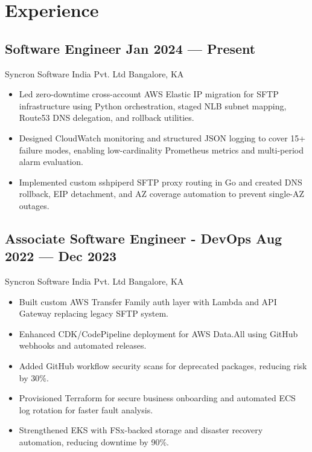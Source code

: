 \documentclass[a4,10pt]{article}
\newcommand{\subtext}[1]{
#1\par\vspace{-0.2cm}}
\newenvironment{zitemize}{
\begin{itemize}\itemsep0pt \parskip0pt \parsep1pt}
{\end{itemize}\vspace{-0.65cm}}
\begin{document}
\section{Experience}

\subsection*{Software Engineer \hfill Jan 2024 --- Present} 
\subtext{Syncron Software India Pvt. Ltd \hfill Bangalore, KA} 
    \begin{zitemize}
        \item Led zero-downtime cross-account AWS Elastic IP migration for SFTP infrastructure using Python orchestration, staged NLB subnet mapping, Route53 DNS delegation, and rollback utilities.
        \item Designed CloudWatch monitoring and structured JSON logging to cover 15+ failure modes, enabling low-cardinality Prometheus metrics and multi-period alarm evaluation.
        \item Implemented custom sshpiperd SFTP proxy routing in Go and created DNS rollback, EIP detachment, and AZ coverage automation to prevent single-AZ outages.
    \end{zitemize}

\subsection*{Associate Software Engineer - DevOps \hfill Aug 2022 --- Dec 2023} 
\subtext{Syncron Software India Pvt. Ltd \hfill Bangalore, KA} 
    \begin{zitemize}
        \item Built custom AWS Transfer Family auth layer with Lambda and API Gateway replacing legacy SFTP system.
        \item Enhanced CDK/CodePipeline deployment for AWS Data.All using GitHub webhooks and automated releases.
        \item Added GitHub workflow security scans for deprecated packages, reducing risk by 30\%.
        \item Provisioned Terraform for secure business onboarding and automated ECS log rotation for faster fault analysis.
        \item Strengthened EKS with FSx-backed storage and disaster recovery automation, reducing downtime by 90\%.
    \end{zitemize}
\end{document}
